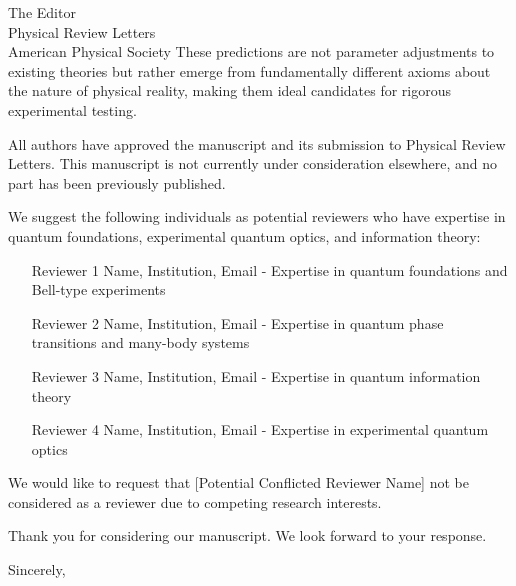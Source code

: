 \documentclass[11pt,letterpaper]{letter}
\begin{document}
\begin{letter}{The Editor\\Physical Review Letters\\American Physical Society}
These predictions are not parameter adjustments to existing theories but rather emerge from fundamentally different axioms about the nature of physical reality, making them ideal candidates for rigorous experimental testing.

All authors have approved the manuscript and its submission to Physical Review Letters. This manuscript is not currently under consideration elsewhere, and no part has been previously published.

We suggest the following individuals as potential reviewers who have expertise in quantum foundations, experimental quantum optics, and information theory:

\begin{enumerate}
\item [Reviewer 1 Name, Institution, Email] - Expertise in quantum foundations and Bell-type experiments
\item [Reviewer 2 Name, Institution, Email] - Expertise in quantum phase transitions and many-body systems
\item [Reviewer 3 Name, Institution, Email] - Expertise in quantum information theory
\item [Reviewer 4 Name, Institution, Email] - Expertise in experimental quantum optics
\end{enumerate}

We would like to request that [Potential Conflicted Reviewer Name] not be considered as a reviewer due to competing research interests.

Thank you for considering our manuscript. We look forward to your response.

\closing{Sincerely,}

\end{letter}
\end{document}
